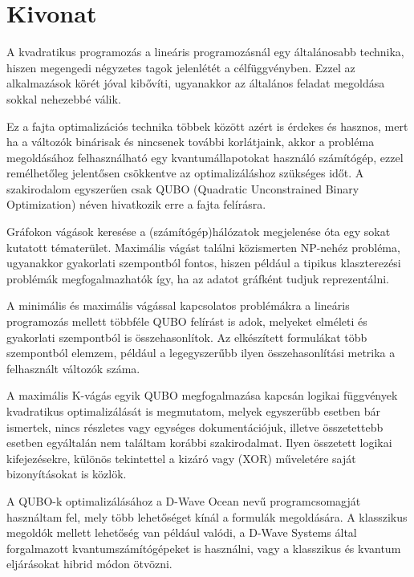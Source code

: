 
\setcounter{page}{1}

\selecthungarian

\chapter*{Kivonat}

A kvadratikus programozás a lineáris programozásnál egy általánosabb technika, hiszen megengedi négyzetes tagok jelenlétét a célfüggvényben. Ezzel az alkalmazások körét jóval kibővíti, ugyanakkor az általános feladat megoldása sokkal nehezebbé válik.

Ez a fajta optimalizációs technika többek között azért is érdekes és hasznos, mert ha a változók binárisak és nincsenek további korlátjaink, akkor a probléma megoldásához felhasználható egy kvantumállapotokat használó számítógép, ezzel remélhetőleg jelentősen csökkentve az optimalizáláshoz szükséges időt. A szakirodalom egyszerűen csak QUBO (Quadratic Unconstrained Binary Optimization) néven hivatkozik erre a fajta felírásra.

Gráfokon vágások keresése a (számítógép)hálózatok megjelenése óta egy sokat kutatott tématerület. Maximális vágást találni közismerten NP-nehéz probléma, ugyanakkor gyakorlati szempontból fontos, hiszen például a tipikus klaszterezési problémák megfogalmazhatók így, ha az adatot gráfként tudjuk reprezentálni.

A minimális és maximális vágással kapcsolatos problémákra a lineáris programozás mellett többféle QUBO felírást is adok, melyeket elméleti és gyakorlati szempontból is összehasonlítok. Az elkészített formulákat több szempontból elemzem, például a legegyszerűbb ilyen összehasonlítási metrika a felhasznált változók száma.

A maximális K-vágás egyik QUBO megfogalmazása kapcsán logikai függvények kvadratikus optimalizálását is megmutatom, melyek egyszerűbb esetben bár ismertek, nincs részletes vagy egységes dokumentációjuk, illetve összetettebb esetben egyáltalán nem találtam korábbi szakirodalmat. Ilyen összetett logikai kifejezésekre, különös tekintettel a kizáró vagy (XOR) műveletére saját bizonyításokat is közlök.

A QUBO-k optimalizálásához a  D-Wave Ocean nevű programcsomagját használtam fel, mely több lehetőséget kínál a formulák megoldására. A klasszikus megoldók mellett lehetőség van például valódi, a D-Wave Systems által forgalmazott kvantumszámítógépeket is használni, vagy a klasszikus és kvantum eljárásokat hibrid módon ötvözni.

